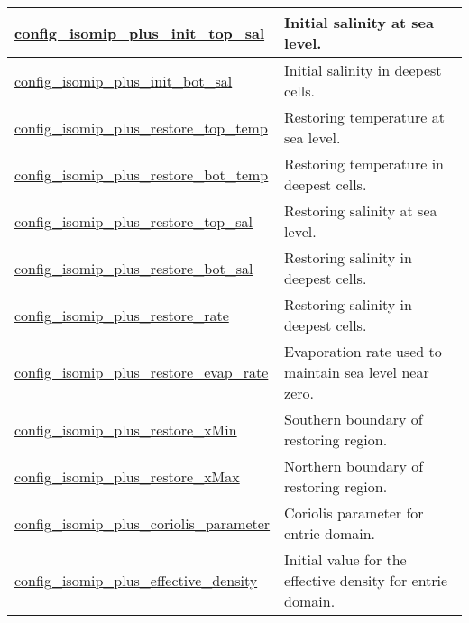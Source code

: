{\begin{center}
\begin{longtable}{| p{2.0in} || p{4.0in} |}
    \hline
    \hyperref[subsec:nm_sec_config_isomip_plus_init_top_sal]{config\_isomip\_plus\_init\_top\_\-sal} & Initial salinity at sea level. \\
    \hline
    \hyperref[subsec:nm_sec_config_isomip_plus_init_bot_sal]{config\_isomip\_plus\_init\_bot\_\-sal} & Initial salinity in deepest cells. \\
    \hline
    \hyperref[subsec:nm_sec_config_isomip_plus_restore_top_temp]{config\_isomip\_plus\_restore\_\-top\_temp} & Restoring temperature at sea level. \\
    \hline
    \hyperref[subsec:nm_sec_config_isomip_plus_restore_bot_temp]{config\_isomip\_plus\_restore\_\-bot\_temp} & Restoring temperature in deepest cells. \\
    \hline
    \hyperref[subsec:nm_sec_config_isomip_plus_restore_top_sal]{config\_isomip\_plus\_restore\_\-top\_sal} & Restoring salinity at sea level. \\
    \hline
    \hyperref[subsec:nm_sec_config_isomip_plus_restore_bot_sal]{config\_isomip\_plus\_restore\_\-bot\_sal} & Restoring salinity in deepest cells. \\
    \hline
    \hyperref[subsec:nm_sec_config_isomip_plus_restore_rate]{config\_isomip\_plus\_restore\_\-rate} & Restoring salinity in deepest cells. \\
    \hline
    \hyperref[subsec:nm_sec_config_isomip_plus_restore_evap_rate]{config\_isomip\_plus\_restore\_\-evap\_rate} & Evaporation rate used to maintain sea level near zero. \\
    \hline
    \hyperref[subsec:nm_sec_config_isomip_plus_restore_xMin]{config\_isomip\_plus\_restore\_x\-Min} & Southern boundary of restoring region. \\
    \hline
    \hyperref[subsec:nm_sec_config_isomip_plus_restore_xMax]{config\_isomip\_plus\_restore\_x\-Max} & Northern boundary of restoring region. \\
    \hline
    \hyperref[subsec:nm_sec_config_isomip_plus_coriolis_parameter]{config\_isomip\_plus\_coriolis\_\-parameter} & Coriolis parameter for entrie domain. \\
    \hline
    \hyperref[subsec:nm_sec_config_isomip_plus_effective_density]{config\_isomip\_plus\_effective\_\-density} & Initial value for the effective density for entrie domain. \\
    \hline
\end{longtable}
\end{center}
}
